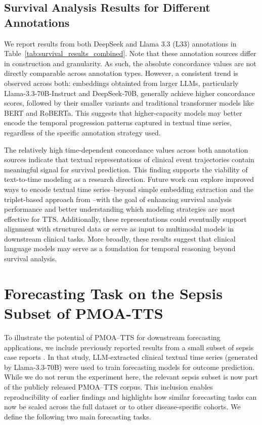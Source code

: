 \subsection{Survival Analysis Results for Different Annotations}
We report results from both DeepSeek and Llama 3.3 (L33) annotations in Table~\ref{tab:survival_results_combined}. Note that these annotation sources differ in construction and granularity. As such, the absolute concordance values are not directly comparable across annotation types.
However, a consistent trend is observed across both: embeddings obtainted from larger LLMs, particularly Llama-3.3-70B-Instruct and DeepSeek-70B, generally achieve higher concordance scores, followed by their smaller variants and traditional transformer models like BERT and RoBERTa. 
This suggests that higher-capacity models may better encode the temporal progression patterns captured in textual time series, regardless of the specific annotation strategy used.

The relatively high time-dependent concordance values across both annotation sources indicate that textual representations of clinical event trajectories contain meaningful signal for survival prediction. This finding supports the viability of text-to-time modeling as a research direction. Future work can explore improved ways to encode textual time series--beyond simple embedding extraction and the triplet-based approach from \cite{oufattolemeds}--with the goal of enhancing survival analysis performance and better understanding which modeling strategies are most effective for TTS. Additionally, these representations could eventually support alignment with structured data or serve as input to multimodal models in downstream clinical tasks. More broadly, these results suggest that clinical language models may serve as a foundation for temporal reasoning beyond survival analysis.



\section{Forecasting Task on the Sepsis Subset of PMOA-TTS}
\label{apd:forecasting}

To illustrate the potential of PMOA–TTS for downstream forecasting applications, we include previously reported results from a small subset of sepsis case reports \citep{noroozizadeh2025reconstructing}. In that study, LLM-extracted clinical textual time series (generated by Llama-3.3-70B) were used to train forecasting models for outcome prediction. While we do not rerun the experiment here, the relevant sepsis subset is now part of the publicly released PMOA–TTS corpus. This inclusion enables reproducibility of earlier findings and highlights how similar forecasting tasks can now be scaled across the full dataset or to other disease-specific cohorts. 
We define the following two main forecasting tasks.

